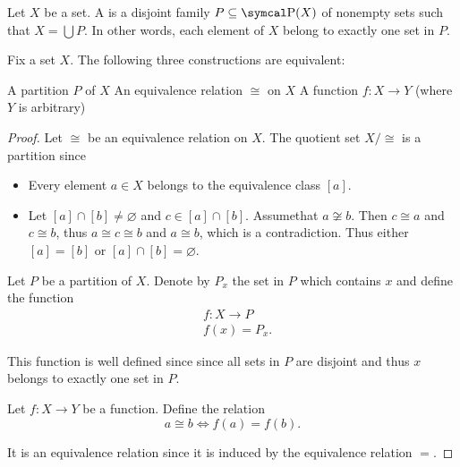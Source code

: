 \begin{definition}\label{def:set_partition}
  Let \( X \) be a set. A  is a disjoint family \( P \subseteq \Power(X) \) of nonempty sets such that \( X = \bigcup P \). In other words, each element of \( X \) belong to exactly one set in \( P \).
\end{definition}

\begin{proposition}\label{thm:equivalence_partition}
  Fix a set \( X \). The following three constructions are equivalent:
  \begin{defenum}
     A partition \( P \) of \( X \)
     An equivalence relation \( \cong \) on \( X \)
     A function \( f: X \to Y \) (where \( Y \) is arbitrary)
  \end{defenum}
\end{proposition}
\begin{proof}
   Let \( \cong \) be an equivalence relation on \( X \). The quotient set \( X / \cong \) is a partition since
  \begin{itemize}
    \item Every element \( a \in X \) belongs to the equivalence class \( [a] \).
    \item Let \( [a] \cap [b] \neq \varnothing \) and \( c \in [a] \cap [b] \). Assume\LEM that \( a \not\cong b \). Then \( c \cong a \) and \( c \cong b \), thus \( a \cong c \cong b \) and \( a \cong b \), which is a contradiction. Thus either \( [a] = [b] \) or \( [a] \cap [b] = \varnothing \).
  \end{itemize}

   Let \( P \) be a partition of \( X \). Denote by \( P_x \) the set in \( P \) which contains \( x \) and define the function
  \begin{align*}
    &f: X \to P \\
    &f(x) = P_x.
  \end{align*}

  This function is well defined since since all sets in \( P \) are disjoint and thus \( x \) belongs to exactly one set in \( P \).

   Let \( f: X \to Y \) be a function. Define the relation
  \begin{equation*}
    a \cong b \iff f(a) = f(b).
  \end{equation*}

  It is an equivalence relation since it is induced by the equivalence relation \( = \).
\end{proof}

